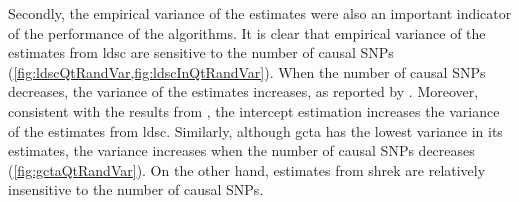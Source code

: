 		Secondly, the empirical variance of the estimates were also an important indicator of the performance of the algorithms.
		It is clear that empirical variance of the estimates from \gls{ldsc} are sensitive to the number of  causal \glspl{SNP} (\cref{fig:ldscQtRandVar,fig:ldscInQtRandVar}).
		When the number of causal \glspl{SNP} decreases, the variance of the estimates increases, as reported by \citet{Bulik-Sullivan2015}.
		Moreover, consistent with the results from \citet{Bulik-Sullivan2015}, the intercept estimation increases the variance of the estimates from \gls{ldsc}.
		Similarly, although \gls{gcta} has the lowest variance in its estimates, the variance increases when the number of causal \glspl{SNP} decreases  (\cref{fig:gctaQtRandVar}). 
		On the other hand, estimates from \gls{shrek} are relatively insensitive to the number of causal \glspl{SNP}.
		
